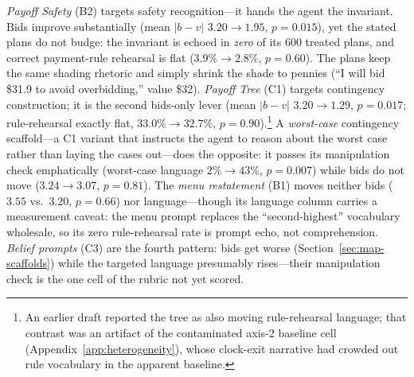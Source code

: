\emph{Payoff Safety} (B2) targets safety recognition---it hands the agent the invariant. Bids improve substantially (mean $|b-v|$ $3.20 \to 1.95$, $p = 0.015$), yet the stated plans do not budge: the invariant is echoed in \emph{zero} of its 600 treated plans, and correct payment-rule rehearsal is flat ($3.9\% \to 2.8\%$, $p = 0.60$). The plans keep the same shading rhetoric and simply shrink the shade to pennies (``I will bid \$31.9 to avoid overbidding,'' value \$32). \emph{Payoff Tree} (C1) targets contingency construction; it is the second bids-only lever (mean $|b-v|$ $3.20 \to 1.29$, $p = 0.017$; rule-rehearsal exactly flat, $33.0\% \to 32.7\%$, $p = 0.90$).\footnote{An earlier draft reported the tree as also moving rule-rehearsal language; that contrast was an artifact of the contaminated axis-2 baseline cell (Appendix~\ref{app:heterogeneity}), whose clock-exit narrative had crowded out rule vocabulary in the apparent baseline.} A \emph{worst-case} contingency scaffold---a C1 variant that instructs the agent to reason about the worst case rather than laying the cases out---does the opposite: it passes its manipulation check emphatically (worst-case language $2\% \to 43\%$, $p = 0.007$) while bids do not move ($3.24 \to 3.07$, $p = 0.81$). The \emph{menu restatement} (B1) moves neither bids ($3.55$ vs.\ $3.20$, $p = 0.66$) nor language---though its language column carries a measurement caveat: the menu prompt replaces the ``second-highest'' vocabulary wholesale, so its zero rule-rehearsal rate is prompt echo, not comprehension. \emph{Belief prompts} (C3) are the fourth pattern: bids get worse (Section~\ref{sec:map-scaffolds}) while the targeted language presumably rises---their manipulation check is the one cell of the rubric not yet scored. 


